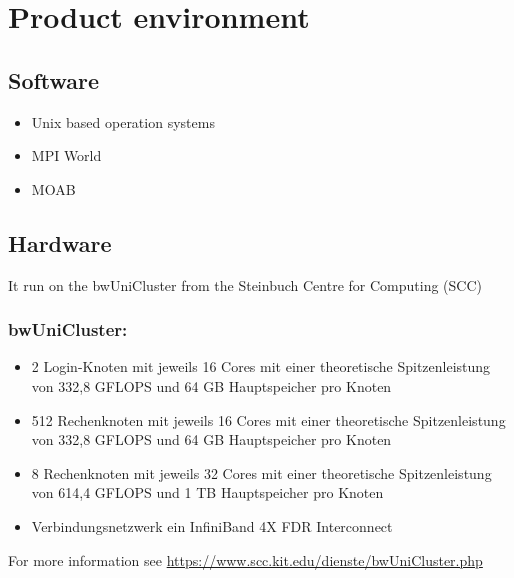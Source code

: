\section{Product environment}
	\subsection{Software}
	\begin{itemize}
		\item{Unix based operation systems}
		\item{MPI World}
		\item{MOAB}
	\end{itemize}
	\subsection{Hardware}
	It run on the bwUniCluster from the Steinbuch Centre for Computing (SCC)
		\subsubsection{bwUniCluster:}
			\begin{itemize}
				\item{2 Login-Knoten mit jeweils 16 Cores mit einer theoretische Spitzenleistung von 332,8 GFLOPS und 64 GB Hauptspeicher pro Knoten}
				\item{512 Rechenknoten mit jeweils 16 Cores mit einer theoretische Spitzenleistung von 332,8 GFLOPS und 64 GB Hauptspeicher pro Knoten}
				\item{8 Rechenknoten mit jeweils 32 Cores mit einer theoretische Spitzenleistung von 614,4 GFLOPS und 1 TB Hauptspeicher pro Knoten}
				\item{Verbindungsnetzwerk ein InfiniBand 4X FDR Interconnect}
			\end{itemize}
		For more information see \href{https://www.scc.kit.edu/dienste/bwUniCluster.php}{https://www.scc.kit.edu/dienste/bwUniCluster.php}
    
 